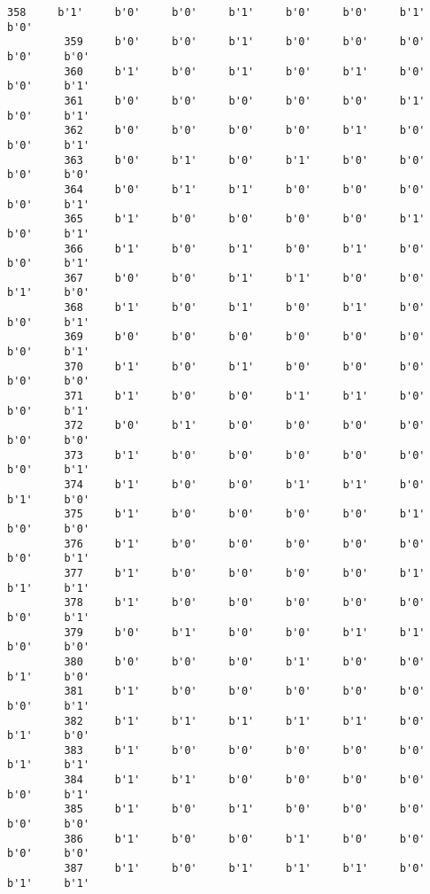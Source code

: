 \documentclass[11pt]{article}
\begin{document}
\begin{Verbatim}[commandchars=\\\{\}]
         358     b'1'     b'0'     b'0'     b'1'     b'0'     b'0'     b'1'     b'0'   
         359     b'0'     b'0'     b'1'     b'0'     b'0'     b'0'     b'0'     b'0'   
         360     b'1'     b'0'     b'1'     b'0'     b'1'     b'0'     b'0'     b'1'   
         361     b'0'     b'0'     b'0'     b'0'     b'0'     b'1'     b'0'     b'1'   
         362     b'0'     b'0'     b'0'     b'0'     b'1'     b'0'     b'0'     b'1'   
         363     b'0'     b'1'     b'0'     b'1'     b'0'     b'0'     b'0'     b'0'   
         364     b'0'     b'1'     b'1'     b'0'     b'0'     b'0'     b'0'     b'1'   
         365     b'1'     b'0'     b'0'     b'0'     b'0'     b'1'     b'0'     b'1'   
         366     b'1'     b'0'     b'1'     b'0'     b'1'     b'0'     b'0'     b'1'   
         367     b'0'     b'0'     b'1'     b'1'     b'0'     b'0'     b'1'     b'0'   
         368     b'1'     b'0'     b'1'     b'0'     b'1'     b'0'     b'0'     b'1'   
         369     b'0'     b'0'     b'0'     b'0'     b'0'     b'0'     b'0'     b'1'   
         370     b'1'     b'0'     b'1'     b'0'     b'0'     b'0'     b'0'     b'0'   
         371     b'1'     b'0'     b'0'     b'1'     b'1'     b'0'     b'0'     b'1'   
         372     b'0'     b'1'     b'0'     b'0'     b'0'     b'0'     b'0'     b'0'   
         373     b'1'     b'0'     b'0'     b'0'     b'0'     b'0'     b'0'     b'1'   
         374     b'1'     b'0'     b'0'     b'1'     b'1'     b'0'     b'1'     b'0'   
         375     b'1'     b'0'     b'0'     b'0'     b'0'     b'1'     b'0'     b'0'   
         376     b'1'     b'0'     b'0'     b'0'     b'0'     b'0'     b'0'     b'1'   
         377     b'1'     b'0'     b'0'     b'0'     b'0'     b'1'     b'1'     b'1'   
         378     b'1'     b'0'     b'0'     b'0'     b'0'     b'0'     b'0'     b'1'   
         379     b'0'     b'1'     b'0'     b'0'     b'1'     b'1'     b'0'     b'0'   
         380     b'0'     b'0'     b'0'     b'1'     b'0'     b'0'     b'1'     b'0'   
         381     b'1'     b'0'     b'0'     b'0'     b'0'     b'0'     b'0'     b'1'   
         382     b'1'     b'1'     b'1'     b'1'     b'1'     b'0'     b'1'     b'0'   
         383     b'1'     b'0'     b'0'     b'0'     b'0'     b'0'     b'1'     b'1'   
         384     b'1'     b'1'     b'0'     b'0'     b'0'     b'0'     b'0'     b'1'   
         385     b'1'     b'0'     b'1'     b'0'     b'0'     b'0'     b'0'     b'0'   
         386     b'1'     b'0'     b'0'     b'1'     b'0'     b'0'     b'0'     b'0'   
         387     b'1'     b'0'     b'1'     b'1'     b'1'     b'0'     b'1'     b'1'   

\end{Verbatim}
\end{document}
